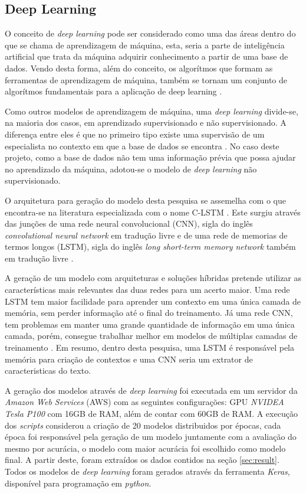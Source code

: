 \documentclass[12pt]{article}
\begin{document}
\subsection{Deep Learning}\label{sec:deep}

O conceito de \emph{deep learning} pode ser considerado como uma das áreas dentro do que se chama de aprendizagem de máquina, esta, seria a parte de inteligência artificial que trata da máquina adquirir conhecimento a partir de uma base de dados. Vendo desta forma, além do conceito, os algorítmos que formam as ferramentas de aprendizagem de máquina, também se tornam um conjunto de algorítmos fundamentais para a aplicação de deep learning \cite{carrio:17}.

Como outros modelos de aprendizagem de máquina, uma \emph{deep learning} divide-se, na maioria dos casos, em aprendizado supervisionado e não supervisionado. A diferença entre eles é que no primeiro tipo existe uma supervisão de um especialista no contexto em que a base de dados se encontra \cite{deng:13}. No caso deste projeto, como a base de dados não tem uma informação prévia que possa ajudar no aprendizado da máquina, adotou-se o modelo de \emph{deep learning} não supervisionado. 

O arquitetura para geração do modelo desta pesquisa se assemelha com o que encontra-se na literatura especializada com o nome C-LSTM \cite{zhou:15,wang:18,stollenga:15,arbelle:19}. Este surgiu através das junções de uma rede neural convolucional (CNN), sigla do inglês \emph{convolutional neural network} em tradução livre e de uma rede de memorias de termos longos (LSTM), sigla do inglês \emph{long short-term memory network} também em tradução livre \cite{zhou:15}.

A geração de um modelo com arquiteturas e soluções híbridas pretende utilizar as características mais relevantes das duas redes para um acerto maior. Uma rede LSTM tem maior facilidade para aprender um contexto em uma única camada de memória, sem perder informação até o final do treinamento. Já uma rede CNN, tem problemas em manter uma grande quantidade de informação em uma única camada, porém, consegue trabalhar melhor em modelos de múltiplas camadas de treinamento \cite{hassan:17}. Em resumo, dentro desta pesquisa, uma LSTM é responsável pela memória para criação de contextos e uma CNN seria um extrator de caracteristicas do texto.

A geração dos modelos através de \emph{deep learning} foi executada em um servidor da \emph{Amazon Web Services} (AWS) com as seguintes configurações: GPU \emph{NVIDEA Tesla P100} com 16GB de RAM, além de contar com 60GB de RAM. A execução dos \emph{scripts} considerou a criação de 20 modelos distribuidos por épocas, cada época foi responsável pela geração de um modelo juntamente com a avaliação do mesmo por acurácia, o modelo com maior acurácia foi escolhido como modelo final. A partir deste, foram extraídos os dados contidos na seção \ref{sec:result}. Todos os modelos de \emph{deep learning} foram gerados através da ferramenta \emph{Keras}, disponível para programação em \emph{python}.
\end{document}
